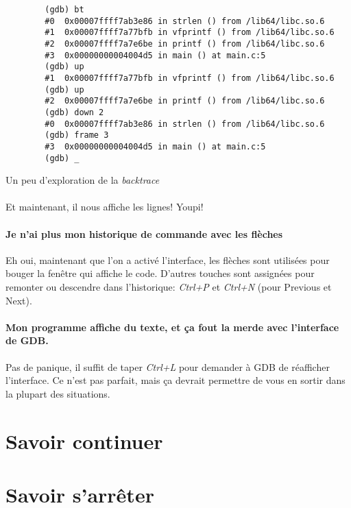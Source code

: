 \begin{listing}[H]
	\begin{verbatim}
		(gdb) bt
		#0  0x00007ffff7ab3e86 in strlen () from /lib64/libc.so.6
		#1  0x00007ffff7a77bfb in vfprintf () from /lib64/libc.so.6
		#2  0x00007ffff7a7e6be in printf () from /lib64/libc.so.6
		#3  0x00000000004004d5 in main () at main.c:5
		(gdb) up
		#1  0x00007ffff7a77bfb in vfprintf () from /lib64/libc.so.6
		(gdb) up
		#2  0x00007ffff7a7e6be in printf () from /lib64/libc.so.6
		(gdb) down 2
		#0  0x00007ffff7ab3e86 in strlen () from /lib64/libc.so.6
		(gdb) frame 3
		#3  0x00000000004004d5 in main () at main.c:5
		(gdb) _
	\end{verbatim}
	\caption{Un peu d'exploration de la \textit{backtrace}}
\end{listing}

\paragraph{} Et maintenant, il nous affiche les lignes! Youpi!

\paragraph{Je n'ai plus mon historique de commande avec les flèches \frownie}
Eh oui, maintenant que l'on a activé l'interface, les flèches sont utilisées
pour bouger la fenêtre qui affiche le code. D'autres touches sont assignées
pour remonter ou descendre dans l'historique: \textit{Ctrl+P} et
\textit{Ctrl+N} (pour Previous et Next).

\paragraph{Mon programme affiche du texte, et ça fout la merde avec l'interface
	de GDB.} Pas de panique, il suffit de taper \textit{Ctrl+L} pour demander à
GDB de réafficher l'interface. Ce n'est pas parfait, mais ça devrait permettre
de vous en sortir dans la plupart des situations.

\section{Savoir continuer}


\section{Savoir s'arrêter}

